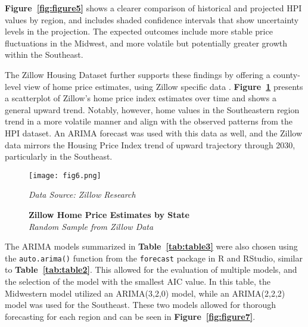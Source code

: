 \documentclass[journal,article,submit,pdftex,moreauthors]{Definitions/mdpi}
\begin{document}
\textbf{Figure~\ref{fig:figure5}} shows a clearer comparison of historical and projected HPI values by region, and includes shaded confidence intervals that show uncertainty levels in the projection. The expected outcomes include more stable price fluctuations in the Midwest, and more volatile but potentially greater growth within the Southeast.

The Zillow Housing Dataset further supports these findings by offering a county-level view of home price estimates, using Zillow specific data \citep{zillow_2024_housing}. \textbf{Figure~\ref{fig:figure6}} presents a scatterplot of Zillow’s home price index estimates over time and shows a general upward trend. Notably, however, home values in the Southeastern region trend in a more volatile manner and align with the observed patterns from the HPI dataset. An ARIMA forecast was used with this data as well, and the Zillow data mirrors the Housing Price Index trend of upward trajectory through 2030, particularly in the Southeast.

\begin{figure}[H]
  \centering
  \texttt{[image: fig6.png]}
  \caption{\textbf{Zillow Home Price Estimates by State}\\\textit{Random Sample from Zillow Data}}
  \label{fig:figure6}
  \vspace{1ex}
  {\footnotesize\textit{Data Source: Zillow Research}}
\end{figure}

The ARIMA models summarized in \textbf{Table~\ref{tab:table3}} were also chosen using the \texttt{auto.arima()} function from the \texttt{forecast} package in R and RStudio, similar to \textbf{Table~\ref{tab:table2}}. This allowed for the evaluation of multiple models, and the selection of the model with the smallest AIC value. In this table, the Midwestern model utilized an ARIMA(3,2,0) model, while an ARIMA(2,2,2) model was used for the Southeast. These two models allowed for thorough forecasting for each region and can be seen in \textbf{Figure~\ref{fig:figure7}}. 
\end{document}
